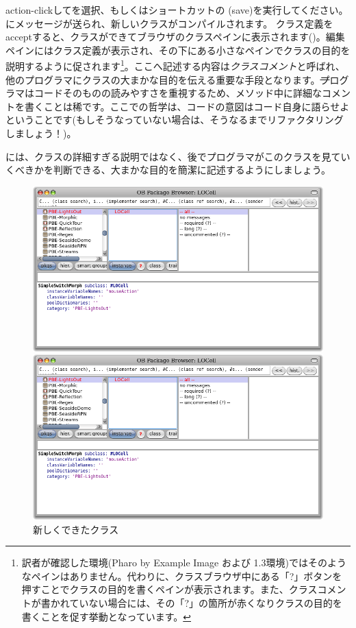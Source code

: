 \documentclass[a4paper,10pt,twoside]{book}
\begin{document}
action-clickしてを選択、もしくはショートカットの (save)を実行してください。にメッセージが送られ、新しいクラスがコンパイルされます。
クラス定義をacceptすると、クラスができてブラウザのクラスペインに表示されます()。編集ペインにはクラス定義が表示され、その下にある小さなペインでクラスの目的を説明するように促されます\footnote{訳者が確認した環境(Pharo by Example Image および 1.3環境)ではそのようなペインはありません。代わりに、クラスブラウザ中にある「?」ボタンを押すことでクラスの目的を書くペインが表示されます。また、クラスコメントが書かれていない場合には、その「?」の箇所が赤くなりクラスの目的を書くことを促す挙動となっています。}。ここへ記述する内容は\emph{クラスコメント}と呼ばれ、他のプログラマにクラスの大まかな目的を伝える重要な手段となります。\st プログラマはコードそのものの読みやすさを重視するため、メソッド中に詳細なコメントを書くことは稀です。ここでの哲学は、コードの意図はコード自身に語らせよということです(もしそうなっていない場合は、そうなるまでリファクタリングしましょう！)。


には、クラスの詳細すぎる説明ではなく、後でプログラマがこのクラスを見ていくべきかを判断できる、大まかな目的を簡潔に記述するようにしましょう。


\begin{figure}[h!t]
\ifluluelse
	{\centerline {\includegraphics[width=\textwidth]{LOCell}}}
	{\centerline {\includegraphics[scale=0.7]{LOCell}}}
\caption{新しくできたクラス }
\end{figure}
\end{document}
